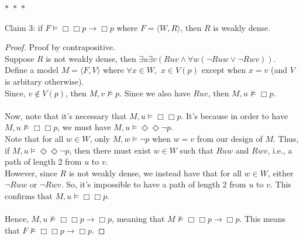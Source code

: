 \documentclass[12pt]{article}
\newcommand{\B}{\Box}
\newcommand{\D}{\Diamond}
\newcommand{\s}{\vDash}
\newcommand{\ns}{\nvDash}
\begin{document}
\noindent
\begin{center}
    $\ast$~$\ast$~$\ast$
\end{center}
Claim 3: if $F \vDash \B \B p \rightarrow \B p$ where $F = \langle W, R \rangle$, then $R$ is weakly dense. 
\begin{proof} Proof by contrapositive.\\
    Suppose $R$ is not weakly dense, then $\exists u \exists v (Ruv \land \forall w(\neg Ruw \lor \neg Rwv))$.
    Define a model $M = \langle F, V \rangle$ where $\forall x \in W,$ $x \in V(p)$ except when $x = v$ (and $V$ is arbitary otherwise).\\
    Since, $v \notin V(p)$, then $M, v \ns p$.
    Since we also have $Ruv$, then $M, u \ns \B p$.\\
    \\
    Now, note that it's necessary that $M, u \s \B \B p$.
    It's because in order to have $M, u \ns \B \B p$, we must have $M, u \s \D \D \neg p$.\\
    Note that for all $w \in W$, only $M, w \s \neg p$ when $w = v$ from our design of $M$.
    Thus, if $M, u \s \D \D \neg p$, then there must exist $w \in W$ such that $Ruw$ and $Rwv$, i.e., a path of length $2$ from $u$ to $v$.\\
    However, since $R$ is not weakly dense, we instead have that for all $w \in W$, either $\neg Ruw$ or $\neg Rwv$.
    So, it's impossible to have a path of length 2 from $u$ to $v$.
    This confirms that $M, u \s \B \B p$.\\ 
    \\
    Hence, $M, u \ns \B \B p \to \B p$, meaning that $M \ns \B \B p \to \B p$.
    This means that $F \ns \B \B p \to \B p$.

\end{proof}
\end{document}
